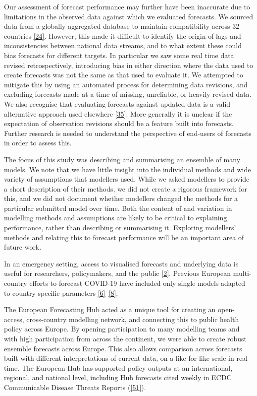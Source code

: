 \documentclass[
]{article}
\begin{document}
Our assessment of forecast performance may further have been inaccurate due to limitations in the observed data against which we evaluated forecasts. We sourced data from a globally aggregated database to maintain compatibility across 32 countries \protect\hyperlink{ref-dongInteractiveWebbasedDashboard2020}{{[}24{]}}. However, this made it difficult to identify the origin of lags and inconsistencies between national data streams, and to what extent these could bias forecasts for different targets. In particular we saw some real time data revised retrospectively, introducing bias in either direction where the data used to create forecasts was not the same as that used to evaluate it. We attempted to mitigate this by using an automated process for determining data revisions, and excluding forecasts made at a time of missing, unreliable, or heavily revised data. We also recognise that evaluating forecasts against updated data is a valid alternative approach used elsewhere \protect\hyperlink{ref-cramerEvaluationIndividualEnsemble2021}{{[}35{]}}. More generally it is unclear if the expectation of observation revisions should be a feature built into forecasts. Further research is needed to understand the perspective of end-users of forecasts in order to assess this.

The focus of this study was describing and summarising an ensemble of many models. We note that we have little insight into the individual methods and wide variety of assumptions that modellers used. While we asked modellers to provide a short description of their methods, we did not create a rigorous framework for this, and we did not document whether modellers changed the methods for a particular submitted model over time. Both the content of and variation in modelling methods and assumptions are likely to be critical to explaining performance, rather than describing or summarising it. Exploring modellers' methods and relating this to forecast performance will be an important area of future work.

In an emergency setting, access to visualised forecasts and underlying data is useful for researchers, policymakers, and the public \protect\hyperlink{ref-cdcCoronavirusDisease20192020}{{[}2{]}}. Previous European multi-country efforts to forecast COVID-19 have included only single models adapted to country-specific parameters \protect\hyperlink{ref-aguasModellingCOVID19Pandemic2020}{{[}6{]}}--\protect\hyperlink{ref-agostoMonitoringCOVID19Contagion2021}{{[}8{]}}.

The European Forecasting Hub acted as a unique tool for creating an open-access, cross-country modelling network, and connecting this to public health policy across Europe. By opening participation to many modelling teams and with high participation from across the continent, we were able to create robust ensemble forecasts across Europe. This also allows comparison across forecasts built with different interpretations of current data, on a like for like scale in real time. The European Hub has supported policy outputs at an international, regional, and national level, including Hub forecasts cited weekly in ECDC Communicable Disease Threats Reports (\protect\hyperlink{ref-europeancentrefordiseasepreventionandcontrolWeeklyThreatsReports}{{[}51{]}}).
\end{document}
